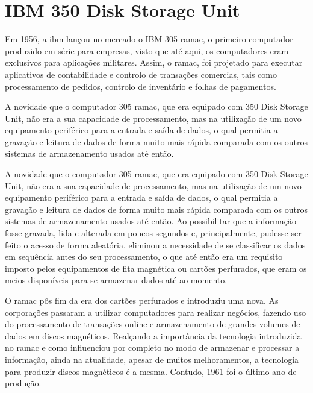 \documentclass{report}
\begin{document}
\newpage
		\section{IBM 350 Disk Storage Unit}
		
		Em 1956, a \ac{ibm} lançou no mercado o IBM 305 \ac{ramac}, o primeiro computador produzido em série para empresas, visto que até aqui, os computadores eram exclusivos para aplicações militares. Assim, o \ac{ramac}, foi projetado para executar aplicativos de contabilidade e controlo de transações comercias, tais como processamento de pedidos, controlo de inventário e folhas de pagamentos.
\vspace{1mm}

		A novidade que o computador 305 \ac{ramac}, que era equipado com 350 Disk Storage Unit, não era a sua capacidade de processamento, mas na utilização de um novo equipamento periférico para a entrada e saída de dados, o qual permitia a gravação e leitura de dados de forma muito mais rápida comparada com os outros sistemas de armazenamento usados até então.
\vspace{1mm}
		
		A novidade que o computador 305 \ac{ramac}, que era equipado com 350 Disk Storage Unit, não era a sua capacidade de processamento, mas na utilização de um novo equipamento periférico para a entrada e saída de dados, o qual permitia a gravação e leitura de dados de forma muito mais rápida comparada com os outros sistemas de armazenamento usados até então. Ao possibilitar que a informação fosse gravada, lida e alterada em poucos segundos e, principalmente, pudesse ser feito o acesso de forma aleatória, eliminou a necessidade de se classificar os dados em sequência antes do seu processamento, o que até então era um requisito imposto pelos equipamentos de fita magnética ou cartões perfurados, que eram os meios disponíveis para se armazenar dados até ao momento.
\vspace{1mm}

		 O \ac{ramac} pôs fim da era dos cartões perfurados e introduziu uma nova. As corporações passaram a utilizar computadores para realizar negócios, fazendo uso do processamento de transações online e armazenamento de grandes volumes de dados em discos magnéticos. Realçando a importância da tecnologia introduzida no \ac{ramac} e como influenciou por completo no modo de armazenar e processar a informação, ainda na atualidade, apesar de muitos melhoramentos, a tecnologia para produzir discos magnéticos é a mesma. Contudo, 1961 foi o último ano de produção.
\end{document}
